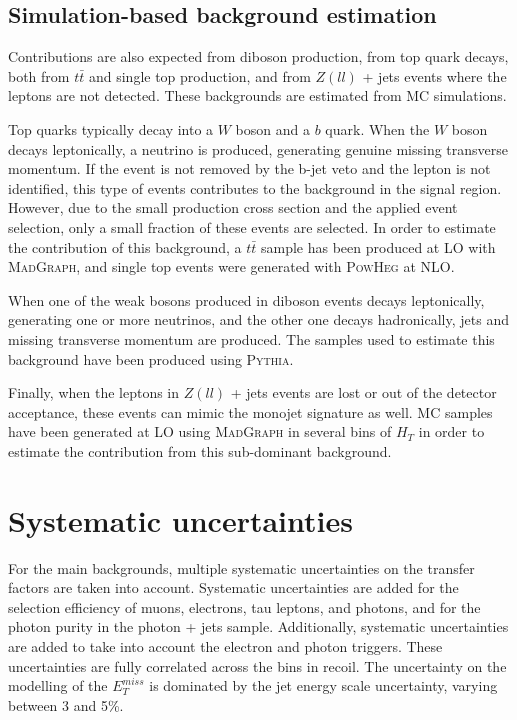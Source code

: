 \subsection{Simulation-based background estimation}

Contributions are also expected from diboson production, from top quark decays, both from $t\bar{t}$ and single top production, and from $Z(ll)$ + jets events where the leptons are not detected. These backgrounds are estimated from MC simulations. 

Top quarks typically decay into a $W$ boson and a $b$ quark. When the $W$ boson decays leptonically, a neutrino is produced, generating genuine missing transverse momentum. If the event is not removed by the b-jet veto and the lepton is not identified, this type of events contributes to the background in the signal region. However, due to the small production cross section and the applied event selection, only a small fraction of these events are selected. In order to estimate the contribution of this background, a $t\bar{t}$ sample has been produced at \ac{LO} with \textsc{MadGraph}, and single top events were generated with \textsc{PowHeg} at \ac{NLO}.

When one of the weak bosons produced in diboson events decays leptonically, generating one or more neutrinos, and the other one decays hadronically, jets and missing transverse momentum are produced. The samples used to estimate this background have been produced using \textsc{Pythia}.

Finally, when the leptons in $Z(ll)$ + jets events are lost or out of the detector acceptance, these events can mimic the monojet signature as well. MC samples have been generated at \ac{LO} using \textsc{MadGraph} in several bins of $H_T$ in order to estimate the contribution from this sub-dominant background.

\section{Systematic uncertainties}
\label{sec:syst}

For the main backgrounds, multiple systematic uncertainties on the transfer factors are taken into account. Systematic uncertainties are added for the selection efficiency of muons, electrons, tau leptons, and photons, and for the photon purity in the photon + jets sample. Additionally, systematic uncertainties are added to take into account the electron and photon triggers. These uncertainties are fully correlated across the bins in recoil. The uncertainty on the modelling of the $E_T^{miss}$ is dominated by the jet energy scale uncertainty, varying between 3 and 5\%.

